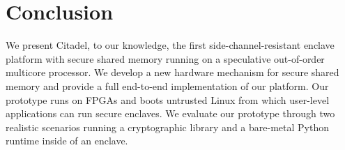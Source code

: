 \section{Conclusion}

We present Citadel, to our knowledge, the first side-channel-resistant enclave platform with secure shared memory running on a speculative out-of-order multicore processor. We develop a new hardware mechanism for secure shared memory and provide a full end-to-end implementation of our platform.
Our prototype runs on FPGAs and boots untrusted Linux from which user-level applications can run secure enclaves.
We evaluate our prototype through two realistic scenarios running a cryptographic library and a bare-metal Python runtime inside of an enclave.

